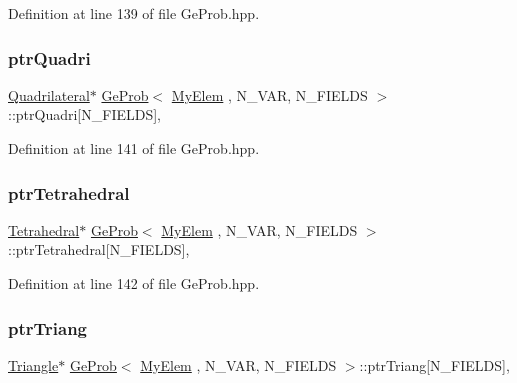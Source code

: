 Definition at line 139 of file Ge\+Prob.\+hpp.

\mbox{\label{classGeProb_ada73c5b700f7681fde499a3a27ff377e}} 
\subsubsection{\texorpdfstring{ptr\+Quadri}{ptrQuadri}}
{\footnotesize\ttfamily \hyperlink{classQuadrilateral}{Quadrilateral}$\ast$ \hyperlink{classGeProb}{Ge\+Prob}$<$ \hyperlink{DG__Prob_8h_a83cd887ced9a6587428f267e50cd4787}{My\+Elem} , N\+\_\+\+V\+AR, N\+\_\+\+F\+I\+E\+L\+DS $>$\+::ptr\+Quadri\mbox{[}N\+\_\+\+F\+I\+E\+L\+DS\mbox{]}\hspace{0.3cm}{\ttfamily [protected]}, {\ttfamily [inherited]}}



Definition at line 141 of file Ge\+Prob.\+hpp.

\mbox{\label{classGeProb_a4e2d7b57253812234e2417097659c40c}} 
\subsubsection{\texorpdfstring{ptr\+Tetrahedral}{ptrTetrahedral}}
{\footnotesize\ttfamily \hyperlink{classTetrahedral}{Tetrahedral}$\ast$ \hyperlink{classGeProb}{Ge\+Prob}$<$ \hyperlink{DG__Prob_8h_a83cd887ced9a6587428f267e50cd4787}{My\+Elem} , N\+\_\+\+V\+AR, N\+\_\+\+F\+I\+E\+L\+DS $>$\+::ptr\+Tetrahedral\mbox{[}N\+\_\+\+F\+I\+E\+L\+DS\mbox{]}\hspace{0.3cm}{\ttfamily [protected]}, {\ttfamily [inherited]}}



Definition at line 142 of file Ge\+Prob.\+hpp.

\mbox{\label{classGeProb_a9fa6ab6ca8b9a2352642a72042d8cf4d}} 
\subsubsection{\texorpdfstring{ptr\+Triang}{ptrTriang}}
{\footnotesize\ttfamily \hyperlink{classTriangle}{Triangle}$\ast$ \hyperlink{classGeProb}{Ge\+Prob}$<$ \hyperlink{DG__Prob_8h_a83cd887ced9a6587428f267e50cd4787}{My\+Elem} , N\+\_\+\+V\+AR, N\+\_\+\+F\+I\+E\+L\+DS $>$\+::ptr\+Triang\mbox{[}N\+\_\+\+F\+I\+E\+L\+DS\mbox{]}\hspace{0.3cm}{\ttfamily [protected]}, {\ttfamily [inherited]}}



